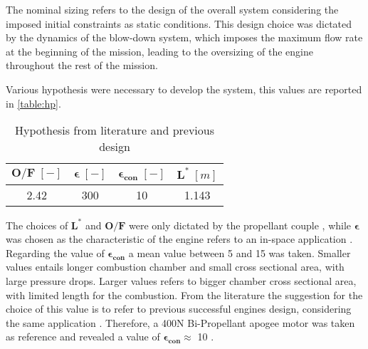 The nominal sizing refers to the design of the overall system considering the imposed initial constraints as static conditions. This design choice was dictated by the dynamics of the blow-down system, which imposes the maximum flow rate at the beginning of the mission, leading to the oversizing of the engine throughout the rest of the mission. %

Various hypothesis were necessary to develop the system, this values are reported in \autoref{table:hp}.

\begin{table}[H]
    \renewcommand{\arraystretch}{1.2}
    \centering
    \begin{tabular}{|c|c|c|c|}
        \hline
        $\boldsymbol{O/F} \; [-]$ & $\boldsymbol{\epsilon} \; [-]$ & $\boldsymbol{\epsilon_{con}} \; [-]$ & $\boldsymbol{L^*} \; [m]$ \\
        \hline
        \hline
        2.42 & 300 & 10 & 1.143 \\
        \hline
    \end{tabular}
    \caption{Hypothesis from literature and previous design}
    \label{table:hp}
\end{table}

The choices of $\boldsymbol{L^*}$  and $\boldsymbol{O/F}$ were only dictated by the propellant couple \cite{sutton}, while $\boldsymbol{\epsilon}$ was chosen as the characteristic of the engine refers to an in-space application \cite{ariane_datasheet}. Regarding the value of $\boldsymbol{\epsilon_{con}}$ a mean value between 5 and 15 was taken. Smaller values entails longer combustion chamber and small cross sectional area, with large pressure drops. Larger values refers to bigger chamber cross sectional area, with limited length for the combustion. From the literature the suggestion for the choice of this value is to refer to previous successful engines design, considering the same application \cite{huzel_huang}. Therefore, a 400N Bi-Propellant apogee motor was taken as reference and revealed a value of $\boldsymbol{\epsilon_{con}} \approx$ 10 \cite{ariane_datasheet}.

